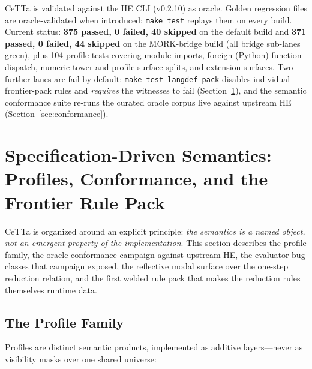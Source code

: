 \documentclass[11pt]{article}
\newcommand{\code}[1]{\texttt{#1}}
\newcommand{\HE}{\textup{HE}}
\newcommand{\CeTTa}{\textup{CeTTa}}
\begin{document}
\CeTTa{} is validated against the \HE{} CLI (v0.2.10) as oracle.
Golden regression files are oracle-validated when introduced;
\code{make test} replays them on every build.  Current status:
\textbf{375 passed, 0 failed, 40 skipped} on the default build and
\textbf{371 passed, 0 failed, 44 skipped} on the MORK-bridge build
(all bridge sub-lanes green), plus 104 profile tests covering module
imports, foreign (Python) function dispatch, numeric-tower and
profile-surface splits, and extension surfaces.  Two further lanes are
fail-by-default: \code{make test-langdef-pack} disables individual
frontier-pack rules and \emph{requires} the witnesses to fail
(Section~\ref{sec:specdriven}), and the semantic conformance suite
re-runs the curated oracle corpus live against upstream \HE{}
(Section~\ref{sec:conformance}).

\section{Specification-Driven Semantics: Profiles, Conformance, and the
  Frontier Rule Pack}
\label{sec:specdriven}

\CeTTa{} is organized around an explicit principle: \emph{the semantics
is a named object, not an emergent property of the implementation}.
This section describes the profile family, the oracle-conformance
campaign against upstream \HE{}, the evaluator bug classes that
campaign exposed, the reflective modal surface over the one-step
reduction relation, and the first welded rule pack that makes the
reduction rules themselves runtime data.

\subsection{The Profile Family}
\label{sec:profiles}

Profiles are distinct semantic products, implemented as additive
layers---never as visibility masks over one shared universe:
\end{document}
